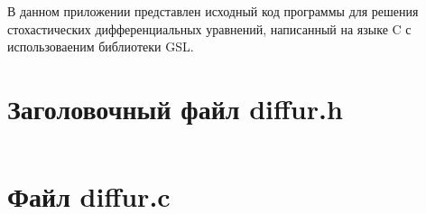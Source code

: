 
В данном приложении представлен исходный код программы для решения стохастических дифференциальных уравнений, написанный на языке C с использоваеним библиотеки GSL.

\chapter{Заголовочный файл diffur.h}
\label{app3:1}

\inputminted{c}{lst/diffur.h}

\chapter{Файл diffur.c}
\label{app3:2}

\inputminted{c}{lst/diffur.c}


